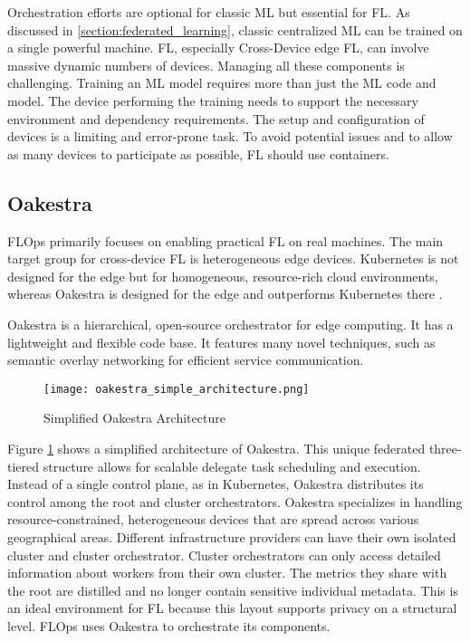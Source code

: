 Orchestration efforts are optional for classic ML but essential for FL.
As discussed in \ref{section:federated_learning}, classic centralized ML can be trained on a single powerful machine.
FL, especially Cross-Device edge FL, can involve massive dynamic numbers of devices.
Managing all these components is challenging.
Training an ML model requires more than just the ML code and model.
The device performing the training needs to support the necessary environment and dependency requirements.
The setup and configuration of devices is a limiting and error-prone task.
To avoid potential issues and to allow as many devices to participate as possible, FL should use containers. 


\subsection{Oakestra}

FLOps primarily focuses on enabling practical FL on real machines.
The main target group for cross-device FL is heterogeneous edge devices.
Kubernetes is not designed for the edge but for homogeneous, resource-rich cloud environments, whereas Oakestra is designed for the edge and outperforms Kubernetes there \cite{paper:oakestra_usenix}.

Oakestra is a hierarchical, open-source orchestrator for edge computing.
It has a lightweight and flexible code base.
It features many novel techniques, such as semantic overlay networking for efficient service communication.

\begin{figure}[!ht]
    \begin{adjustwidth}{-0.1\paperwidth}{-0.1\paperwidth}
        \centering
        \texttt{[image: oakestra\_simple\_architecture.png]}
        \caption{Simplified Oakestra Architecture}
        \label{fig:simple_oakestra_architecture}
    \end{adjustwidth}
\end{figure}

Figure \ref{fig:simple_oakestra_architecture} shows a simplified architecture of Oakestra.
This unique federated three-tiered structure allows for scalable delegate task scheduling and execution.
Instead of a single control plane, as in Kubernetes, Oakestra distributes its control among the root and cluster orchestrators.
Oakestra specializes in handling resource-constrained, heterogeneous devices that are spread across various geographical areas.
Different infrastructure providers can have their own isolated cluster and cluster orchestrator.
Cluster orchestrators can only access detailed information about workers from their own cluster.
The metrics they share with the root are distilled and no longer contain sensitive individual metadata.
This is an ideal environment for FL because this layout supports privacy on a structural level.
FLOps uses Oakestra to orchestrate its components.

\pagebreak
